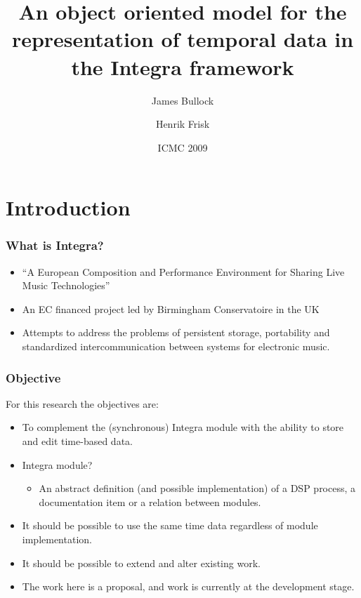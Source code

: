 \documentclass[xcolor=table]{beamer}
\title[Temporal data representation] %
{An object oriented model for the representation of temporal data in the Integra framework}
\author[Bullock \& Frisk] %
{James Bullock\inst{1} \and Henrik Frisk\inst{2}}
\institute[Birmingham, Lund] %
{
\inst{1}Music Technology Department at Birmingham Conservatoire\\
Birmingham City University
\and
\inst{2}Composition Department at Malm\"{o} Academy of Music\\
Lund University
}
\date[ICMC 2009] %
{ICMC 2009}
\begin{document}
\begin{frame}
  \titlepage
\end{frame}


\section{Introduction}

\begin{frame}
  \frametitle{What is Integra?}
  \begin{itemize}
  \item ``A European Composition and Performance Environment for
    Sharing Live Music Technologies''
   \item An EC financed project led by Birmingham Conservatoire in the UK
   \item Attempts to address the problems of persistent storage,
     portability and standardized intercommunication between systems
     for electronic music.
  \end{itemize}
\end{frame}

\begin{frame}
  \frametitle{Objective}

  \begin{block}{For this research the objectives are:}
    \begin{itemize}
    \item<1-> To complement the (synchronous) Integra module with the
      ability to store and edit time-based data.
    \item<2-> \alert{Integra module?}
      \begin{itemize}
      \item<3-> An abstract definition (and possible implementation)
        of a DSP process, a documentation item or a relation between
        modules.
      \end{itemize}
    \item<4-> It should be possible to use the same time data
      regardless of module implementation.
    \item<5-> It should be possible to extend and alter existing work.
    \item<6-> The work here is a proposal, and work is currently at the development stage.
    \end{itemize}
  \end{block}

\end{frame}
\end{document}
